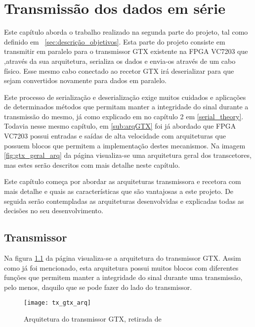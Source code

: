 \chapter{Transmissão dos dados em série}\label{chap:chap4}

Este capítulo aborda o trabalho realizado na segunda parte do projeto, tal como definido em ~\ref{sec:descrição_objetivos}. Esta parte do projeto consiste em transmitir em paralelo para o transmissor GTX existente na FPGA VC7203 que ,através da sua arquitetura, serializa os dados e envia-os através de um cabo físico. Esse mesmo cabo conectado ao recetor GTX irá deserializar para que sejam convertidos novamente para dados em paralelo.

Este processo de serialização e deserialização exige muitos cuidados e aplicações de determinados métodos que permitam manter a integridade do sinal durante a transmissão do mesmo, já como explicado em no capítulo 2 em \ref{serial_theory}. Todavia nesse mesmo capítulo, em \ref{sub:arqGTX} foi já abordado que FPGA VC7203 possui entradas e saídas de alta velocidade com arquiteturas que possuem blocos que permitem a implementação destes mecanismos. Na imagem \ref{fig:gtx_geral_arq} da página \pageref{fig:gtx_geral_arq} visualiza-se uma arquitetura geral dos transcetores, mas estes serão descritos com mais detalhe neste capítulo.

Este capítulo começa por abordar as arquiteturas transmissora e recetora com mais detalhe e quais as características que são vantajosas a este projeto. De seguida serão contempladas as arquiteturas desenvolvidas e explicadas todas as decisões no seu desenvolvimento.

\section{Transmissor} \label{sec:tx_gtx}

Na figura \ref{fig:gtx_tx_arq} da página \pageref{fig:gtx_tx_arq} visualiza-se a arquitetura do transmissor GTX. Assim como já foi mencionado, esta arquitetura possui muitos blocos com diferentes funções que permitem manter a integridade do sinal durante uma transmissão, pelo menos, daquilo que se pode fazer do lado do transmissor.
\begin{figure}[h!]
	\begin{center}
		\leavevmode
		\texttt{[image: tx\_gtx\_arq]}
		\caption{Arquitetura do transmissor GTX, retirada de \cite{R011}}
		\label{fig:gtx_tx_arq}
	\end{center}
\end{figure}

